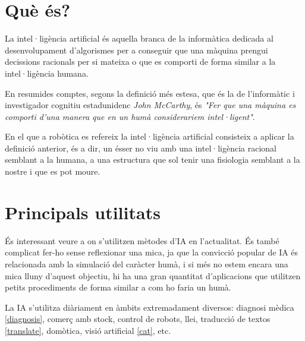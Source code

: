 \section{Què és?}

La intel·ligència artificial és aquella branca de la informàtica dedicada al
desenvolupament d'algorismes per a conseguir que una màquina prengui decissions
 racionals per si mateixa o que es comporti de forma similar a la intel·ligència humana.

En resumides comptes, segons la definició més estesa, que és la de l'informàtic i
investigador cognitiu estadunidenc \emph{John McCarthy}, és \emph{"Fer que una màquina
es comporti d'una manera que en un humà considerariem intel·ligent"}.

En el que a robòtica es refereix la intel·ligència artificial consisteix a aplicar la
definició anterior, és a dir, un ésser no viu amb una intel·ligència racional semblant
a la humana, a una estructura que sol tenir una fisiologia semblant a la nostre i que
es pot moure.
\cite{definiciondeia} \cite{wikiia} \cite{monoia}

\section{Principals utilitats}

És interessant veure a on s'utilitzen mètodes d'IA en l'actualitat. És també complicat fer-ho sense reflexionar una mica, ja que la convicció popular de IA és relacionada amb la simulació del caràcter humà, i si més no estem encara una mica lluny d'aquest objectiu, hi ha una gran quantitat d'aplicacions que utilitzen petits procediments de forma similar a com ho faria un humà.

La IA s'utilitza diàriament en àmbits extremadament diversos: diagnosi mèdica \ref{diagnosis}, comerç amb stock, control de robots, llei, traducció de textos \ref{translate}, domòtica, visió artificial \ref{cat}, etc.



